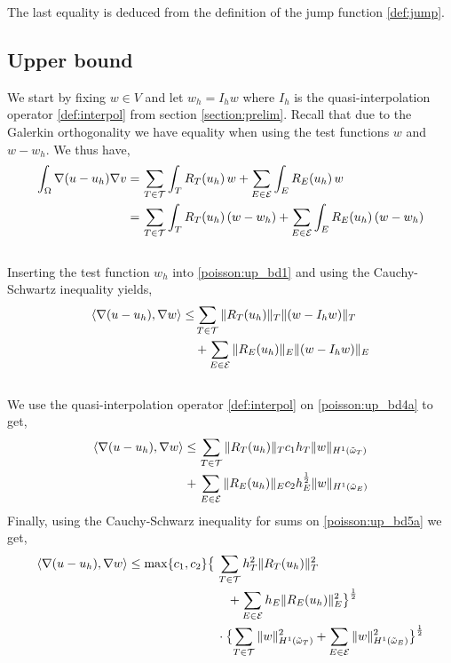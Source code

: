 The last equality is deduced from the definition of the jump function \ref{def:jump}. 
\\
\subsection{Upper bound} \label{poisson_up_bd_section}
We start by fixing $w\in V$ and let $w_h = I_h w$ where $I_h$ is the quasi-interpolation operator \eqref{def:interpol} from section \ref{section:prelim}. Recall that due to the Galerkin orthogonality we have equality when using the test functions $w$ and $w-w_h$. We thus have,
\\
\begin{align} \label{poisson:up_bd1}
\int_\Omega \nabla(u-u_h) \nabla v = & \, \displaystyle\sum_{T \in \mathcal{T}} \displaystyle\int_T R_T(u_h)\, w  + \displaystyle\sum_{E \in \mathcal{E}} \displaystyle\int_E R_E(u_h) \, w  \\ 
= & \, \displaystyle\sum_{T \in \mathcal{T}} \displaystyle\int_T R_T(u_h)\, (w-w_h)  + \displaystyle\sum_{E \in \mathcal{E}} \displaystyle\int_E R_E(u_h) \, (w-w_h) \notag
\end{align}
\\
Inserting the test function $w_h$ into \eqref{poisson:up_bd1} and using the Cauchy-Schwartz inequality yields, 
\begin{align} \label{poisson:up_bd4a}
\langle \nabla(u-u_h), \nabla w \rangle \leq  & \displaystyle\sum_{T \in \mathcal{T}} \| R_T(u_h)\|_T \|(w-I_h w)\|_T  \\ 
& + \displaystyle\sum_{E \in \mathcal{E}} \| R_E(u_h) \|_E \|(w-I_h w)\|_E \notag
\end{align}
\\
We use the quasi-interpolation operator \ref{def:interpol} on \eqref{poisson:up_bd4a} to get, 
\begin{align} \label{poisson:up_bd5a}
\langle \nabla(u-u_h), \nabla w \rangle \leq & \, \displaystyle\sum_{T \in \mathcal{T}} \| R_T(u_h)\|_T c_1 h_T \|w\|_{H^1(\tilde{\omega}_T)} \\
+ & \, \displaystyle\sum_{E \in \mathcal{E}} \| R_E(u_h) \|_E c_2 h_E^{\frac{1}{2}} \|w\|_{H^1(\tilde{\omega}_E)} \notag
\end{align}
Finally, using the Cauchy-Schwarz inequality for sums on \eqref{poisson:up_bd5a} we get,
\begin{align} \label{poisson:up_bd6a}
\langle \nabla(u-u_h), \nabla w \rangle \leq  \max\{c_1, c_2\}\bigl\{& \, \sum_{T \in \mathcal{T}} h_T^2\| R_T(u_h)\|^2_T \\
& \quad + \sum_{E \in \mathcal{E}} h_E\| R_E(u_h) \|^2_E \bigr\}^\frac{1}{2}  \notag \\
& \, \cdot \bigl\{\sum_{T \in \mathcal{T}} \|w\|^2_{H^1(\tilde{\omega}_T)} + \sum_{E \in \mathcal{E}}\|w\|^2_{H^1(\tilde{\omega}_E)}\bigr\}^\frac{1}{2} \notag
\end{align}
